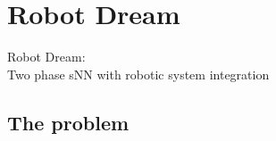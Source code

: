 \documentclass[12pt, aspectratio=169]{beamer}
\begin{document}


\section{Robot Dream}
\begin{frame}
  Robot Dream:\\
  Two phase sNN with robotic system integration
\end{frame}

\subsection{The problem} %
\end{document}
